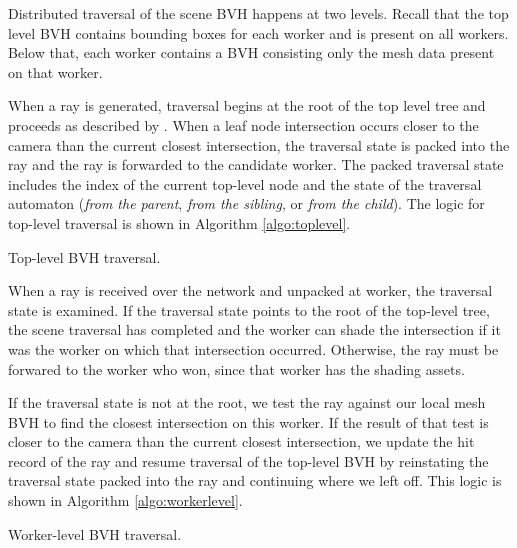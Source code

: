 \documentclass[a4paper,twoside]{article}
\begin{document}
Distributed traversal of the scene BVH happens at two levels. Recall that the
top level BVH contains bounding boxes for each worker and is present on all
workers. Below that, each worker contains a BVH consisting only the mesh data
present on that worker.

When a ray is generated, traversal begins at the root of the top level tree
and proceeds as described by \cite{hapala:2011}. When a leaf node
intersection occurs closer to the camera than the current closest intersection,
the traversal state is packed into the ray and the ray is forwarded to the
candidate worker. The packed traversal state includes the index of the current
top-level node and the state of the traversal automaton (\emph{from the parent},
\emph{from the sibling}, or \emph{from the child}). The logic for top-level
traversal is shown in Algorithm \ref{algo:toplevel}.

\begin{algorithm}
    \SetAlgoLined


    \caption{Top-level BVH traversal.}
    \label{algo:toplevel}
\end{algorithm}

When a ray is received over the network and unpacked at worker, the traversal
state is examined. If the traversal state points to the root of the top-level
tree, the scene traversal has completed and the worker can shade the
intersection if it was the worker on which that intersection occurred.
Otherwise, the ray must be forwared to the worker who won, since that worker has
the shading assets.

If the traversal state is not at the root, we test the ray against our local
mesh BVH to find the closest intersection on this worker. If the result of that
test is closer to the camera than the current closest intersection, we update
the hit record of the ray and resume traversal of the top-level BVH by
reinstating the traversal state packed into the ray and continuing where we left
off. This logic is shown in Algorithm \ref{algo:workerlevel}.

\begin{algorithm}
    \SetAlgoLined


    \caption{Worker-level BVH traversal.}
    \label{algo:workerlevel}
\end{algorithm}
\end{document}
